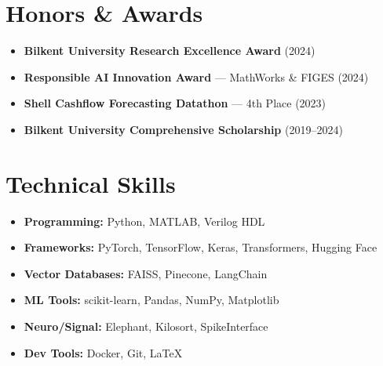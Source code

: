 \documentclass[letterpaper,10pt]{article}
\begin{document}
\begin{minipage}[t]{0.34\textwidth}
\section{Honors \& Awards}
\begin{itemize}
  \item \textbf{Bilkent University Research Excellence Award} (2024)
  \item \textbf{Responsible AI Innovation Award} — MathWorks \& FIGES (2024)
  \item \textbf{Shell Cashflow Forecasting Datathon} — 4th Place (2023)
  \item \textbf{Bilkent University Comprehensive Scholarship} (2019–2024)
\end{itemize}

\section{Technical Skills}
\begin{itemize}
  \item \textbf{Programming:} Python, MATLAB, Verilog HDL
  \item \textbf{Frameworks:} PyTorch, TensorFlow, Keras, Transformers, Hugging Face
  \item \textbf{Vector Databases:} FAISS, Pinecone, LangChain
  \item \textbf{ML Tools:} scikit-learn, Pandas, NumPy, Matplotlib
  \item \textbf{Neuro/Signal:} Elephant, Kilosort, SpikeInterface
  \item \textbf{Dev Tools:} Docker, Git, \LaTeX
\end{itemize}

\end{minipage}
\end{document}
